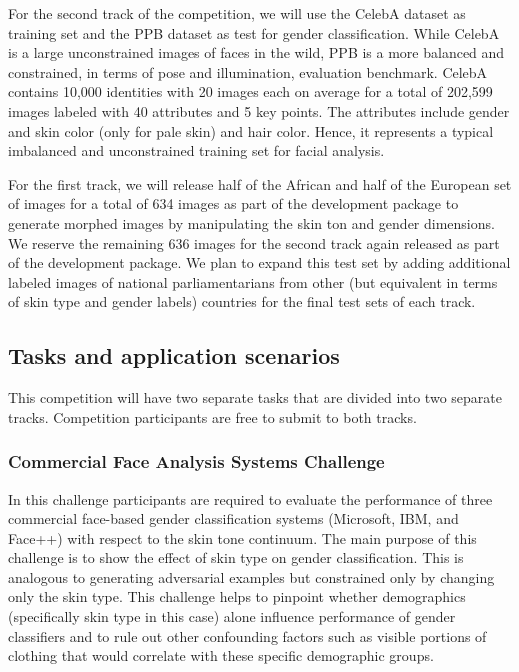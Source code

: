 \documentclass[11pt, oneside]{article}
\makeatletter
\let\@internalcite\cite
\def\cite{\def\citeauthoryear##1##2{##1, ##2}\@internalcite}
\makeatother
\begin{document}


For the second track of the competition, we will use the CelebA dataset \cite{liu2015deep} as training set and the PPB dataset as test for gender classification. While CelebA is a large unconstrained images of faces in the wild, PPB is a more balanced and constrained, in terms of pose and illumination, evaluation benchmark. CelebA contains 10,000 identities with 20 images each on average for a total of 202,599 images labeled with 40 attributes and 5 key points. The attributes include gender and skin color (only for pale skin) and hair color. Hence, it represents a typical imbalanced and unconstrained training set for facial analysis.

For the first track, we will release half of the African and half of the European set of images for a total of 634 images as part of the development package to generate morphed images by manipulating the skin ton and gender dimensions. We reserve the remaining 636 images for the second track again released as part of the development package. We plan to expand this test set by adding additional labeled images of national parliamentarians from other (but equivalent in terms of skin type and gender labels) countries for the final test sets of each track. 

\subsection{Tasks and application scenarios}


This competition will have two separate tasks that are divided into two separate tracks. Competition participants are free to submit to both tracks. 

\subsubsection{Commercial Face Analysis Systems Challenge}
In this challenge participants are required to evaluate the performance of three commercial face-based gender classification systems (Microsoft, IBM, and Face++) with respect to the skin tone continuum. The main purpose of this challenge is to show the effect of skin type on gender classification. This is analogous to generating adversarial examples but constrained only by changing only the skin type. This challenge helps to pinpoint whether demographics (specifically skin type in this case) alone influence performance of gender classifiers and to rule out other confounding factors such as visible portions of clothing that would correlate with these specific demographic groups.
\end{document}
